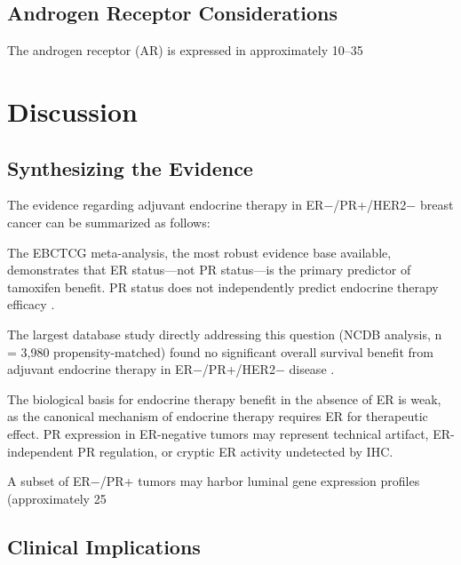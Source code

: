 \documentclass{article}
\begin{document}
\subsection{Androgen Receptor Considerations}

The androgen receptor (AR) is expressed in approximately 10–35%

\section{Discussion}

\subsection{Synthesizing the Evidence}

The evidence regarding adjuvant endocrine therapy in ER−/PR+/HER2− breast cancer can be summarized as follows:

The EBCTCG meta-analysis, the most robust evidence base available, demonstrates that ER status—not PR status—is the primary predictor of tamoxifen benefit. PR status does not independently predict endocrine therapy efficacy \citep{ebctcg2011}.

The largest database study directly addressing this question (NCDB analysis, n = 3,980 propensity-matched) found no significant overall survival benefit from adjuvant endocrine therapy in ER−/PR+/HER2− disease \citep{asco2021ncdb}.

The biological basis for endocrine therapy benefit in the absence of ER is weak, as the canonical mechanism of endocrine therapy requires ER for therapeutic effect. PR expression in ER-negative tumors may represent technical artifact, ER-independent PR regulation, or cryptic ER activity undetected by IHC.

A subset of ER−/PR+ tumors may harbor luminal gene expression profiles (approximately 25%

\subsection{Clinical Implications}
\end{document}
